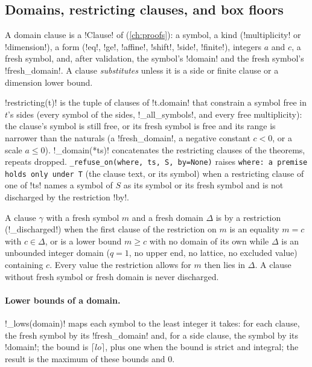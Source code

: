 \subsection{Domains, restricting clauses, and box floors}\label{sec:kernel-floors}

A domain clause is a \py!Clause! of  (\cref{ch:proofs}): a symbol, a kind (\code!multiplicity! or \code!dimension!), a form (\code!eq!, \code!ge!, \code!affine!, \code!shift!, \code!side!, \code!finite!), integers $a$ and $c$, a fresh symbol, and, after validation, the symbol's \code!domain! and the fresh symbol's \code!fresh_domain!. A clause \emph{substitutes} unless it is a side or finite clause or a dimension lower bound.

\begin{definition}\label{def:kernel-restricting}
\py!restricting(t)! is the tuple of clauses of \code!t.domain! that constrain a symbol free in $t$'s sides (every symbol of the sides, \py!_all_symbols!, and every free multiplicity): the clause's symbol is still free, or its fresh symbol is free and its range is narrower than the naturals (a \code!fresh_domain!, a negative constant $c<0$, or a scale $a\le0$). \py!_domain(*ts)! concatenates the restricting clauses of the theorems, repeats dropped. \texttt{\_\allowbreak{}refuse\_\allowbreak{}on(\allowbreak{}where,\allowbreak{} ts,\allowbreak{} S,\allowbreak{} by=None)} raises \texttt{where: a premise holds only under T} (the clause text, or its symbol) when a restricting clause of one of \code!ts! names a symbol of $S$ as its symbol or its fresh symbol and is not discharged by the restriction \code!by!.
\end{definition}

\begin{definition}\label{def:kernel-discharged}
A clause $\gamma$ with a fresh symbol $m$ and a fresh domain $\Delta$ is  by a restriction (\py!_discharged!) when the first clause of the restriction on $m$ is an equality $m=c$ with $c\in\Delta$, or is a lower bound $m\ge c$ with no domain of its own while $\Delta$ is an unbounded integer domain ($q=1$, no upper end, no lattice, no excluded value) containing $c$. Every value the restriction allows for $m$ then lies in $\Delta$. A clause without fresh symbol or fresh domain is never discharged.
\end{definition}

\paragraph{Lower bounds of a domain.} \py!_lows(domain)! maps each symbol to the least integer it takes: for each clause, the fresh symbol by its \code!fresh_domain! and, for a side clause, the symbol by its \code!domain!; the bound is $\lceil \mathit{lo}\rceil$, plus one when the bound is strict and integral; the result is the maximum of these bounds and $0$.


